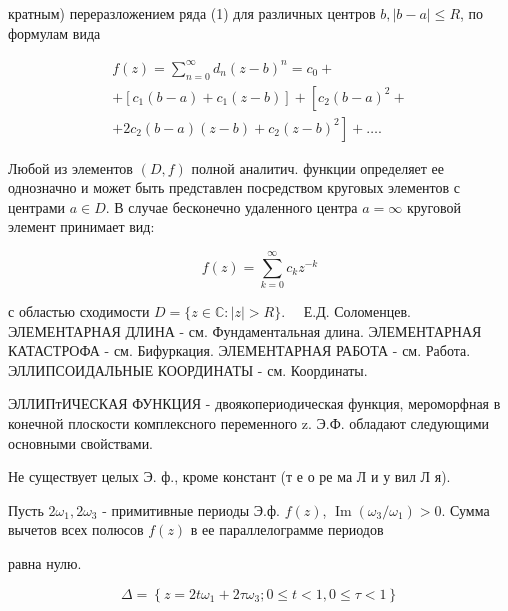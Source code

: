 \documentclass[10pt]{article}
\begin{document}
кратным) переразложением ряда (1) для различных центров $b,|b-a| \leqslant R$, по формулам вида



\[

\begin{gathered}

f(z)=\sum_{n=0}^{\infty} d_{n}(z-b)^{n}=c_{0}+ \\

+\left[c_{1}(b-a)+c_{1}(z-b)\right]+\left[c_{2}(b-a)^{2}+\right. \\

\left.+2 c_{2}(b-a)(z-b)+c_{2}(z-b)^{2}\right]+\ldots .

\end{gathered}

\]



Любой из элементов $(D, f)$ полной аналитич. функции определяет ее однозначно и может быть представлен посредством круговых элементов с центрами $a \in D$. В случае бесконечно удаленного центра $a=\infty$ круговой элемент принимает вид:



\[

f(z)=\sum_{k=0}^{\infty} c_{k} z^{-k}

\]



с областью сходимости $D=\{z \in \mathbb{C}:|z|>R\} . \quad$ Е.Д. Соломенцев. ЭЛЕМЕНТАРНАЯ ДЛИНА - см. Фундаментальная длина. ЭЛЕМЕНТАРНАЯ КАТАСТРОФА - см. Бифуркация. ЭЛЕМЕНТАРНАЯ РАБОТА - см. Работа. ЭЛЛИПСОИДАЛЬНЫЕ КООРДИНАТЫ - см. Координаты.



ЭЛЛИПтИЧЕСКАЯ ФУНКЦИЯ - двоякопериодическая функция, мероморфная в конечной плоскости комплексного переменного z. Э.Ф. обладают следующими основными свойствами.



Не существует целых Э. ф., кроме констант (т е о ре ма Л и у вил Л я).



Пусть $2 \omega_{1}, 2 \omega_{3}$ - примитивные периоды Э.ф. $f(z)$, $\operatorname{Im}\left(\omega_{3} / \omega_{1}\right)>0$. Сумма вычетов всех полюсов $f(z)$ в ее параллелограмме периодов



равна нулю.



\[

\Delta=\left\{z=2 t \omega_{1}+2 \tau \omega_{3} ; 0 \leqslant t<1,0 \leqslant \tau<1\right\}

\]
\end{document}

